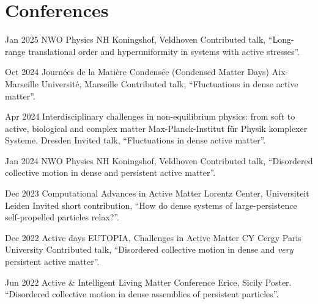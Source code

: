 \documentclass[a4paper]{cvtemplate_en} %
\begin{document}
\section{Conferences}

\begin{cvbody}

\cvitem
	{Jan 2025}
	{}
	{NWO Physics}
	{NH Koningshof, Veldhoven \vspace{-5pt}}
	{}{}{}
	{}
	{Contributed talk, ``Long-range translational order and hyperuniformity in systems with active stresses''.\\}

\cvitem
	{Oct 2024}
	{}
	{Journ\'ees de la Mati\`ere Condens\'ee (Condensed Matter Days)}
	{Aix-Marseille Universit\'e, Marseille }
	{}{}{}
	{}
	{Contributed talk, ``Fluctuations in dense active matter''.\\}

\cvitem
	{Apr 2024}
	{}
	{Interdisciplinary challenges in non-equilibrium physics: from soft to active, biological and complex matter}
	{Max-Planck-Institut für Physik komplexer Systeme, Dresden }
	{}{}{}
	{}
	{Invited talk, ``Fluctuations in dense active matter''.\\}

\cvitem
	{Jan 2024}
	{}
	{NWO Physics}
	{NH Koningshof, Veldhoven }
	{}{}{}
	{}
	{Contributed talk, ``Disordered collective motion in dense and persistent active matter''.\\}

\cvitem
	{Dec 2023}
	{}
	{Computational Advances in Active Matter}
	{Lorentz Center, Universiteit Leiden }
	{}{}{}
	{}
	{Invited short contribution, ``How do dense systems of large-persistence self-propelled particles relax?''.\\}

\cvitem
	{Dec 2022}
	{}
	{Active days EUTOPIA, Challenges in Active Matter}
	{CY Cergy Paris University }
	{}{}{}
	{}
	{Contributed talk, ``Disordered collective motion in dense and \textit{very}\\ persistent active matter''.\\}


\cvitem
	{Jun 2022}
	{}
	{Active \& Intelligent Living Matter Conference}
	{Erice, Sicily }
	{}{}{}
	{}
	{Poster. ``Disordered collective motion in dense assemblies of persistent particles''.\\}


\end{cvbody}
\end{document}
